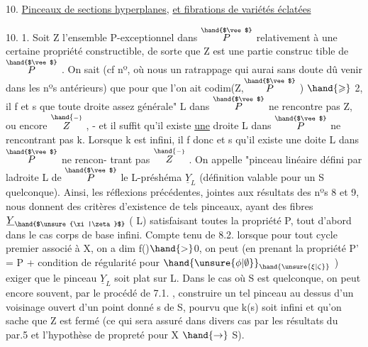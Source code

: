 
10. \uline{Pinceaux de sections hyperplanes}, \uline{et fibrations de variétés éclatées}

10. 1. Soit Z l'ensemble P-exceptionnel dans $\overset{\hand{$\vee$}}{P}$ relativement à une
certaine propriété constructible, de sorte que Z est une partie construc%
tible de $\overset{\hand{$\vee$}}{P}$ .  On sait (cf nº, où nous  un ratrappage
\margin{$/$} qui aurai sans doute dû venir dans les nºs antérieurs) que pour que
l'on ait codim(Z,$\overset{\hand{$\vee$}}{P}$ ) $\hand{\geqslant}$ 2, il f et s que toute droite assez
générale" L dans $\overset{\hand{$\vee$}}{P}$ ne rencontre pas Z,  ou encore $\overset{\hand{\scriptscriptstyle -}}{Z}$ , - et il suffit
qu'il existe \uline{une} droite L dans $\overset{\hand{$\vee$}}{P}$ ne rencontrant pas k. Lorsque 
k est infini, il f donc et s qu'il existe une doite L \margin{\unsure{$-$|$\wedge$}}dans $\overset{\hand{$\vee$}}{P}$ ne rencon-%
trant pas $\overset{\hand{\scriptscriptstyle -}}{Z}$ . On appelle "pinceau linéaire défini par ladroite
L de $\overset{\hand{$\vee$}}{P}$\hand{,} le L-préshéma $\underline{Y}_L$ (définition valable pour un S quelconque).
Ainsi, les réflexions précédentes, jointes aux résultats des nºs 8 et 9,
nous donnent des critères d'existence de tels pinceaux, ayant des fibres
$\underline{Y}_{\hand{$\unsure{\xi|\zeta}$}}$ ( \hand{$\unsure{\xi|\zeta} \in$}L) satisfaisant toutes la propriété P, tout d'abord dans le
cas   corps de base infini.  Compte tenu de
8.2.\hand{,} lorsque  pour tout cycle premier associé à X, on a dim f()$\hand{>}$0,
on peut (en prenant la propriété P' = P + condition de régularité
pour $\hand{\unsure{\phi|\emptyset}}_{\hand{\unsure{\xi|\zeta}}}$ ) exiger que le pinceau $\underline{Y}_L$ soit plat sur L. Dans le cas
où S est quelconque, on peut encore souvent, par le procédé de 7.1. ,
construire un tel pinceau au dessus d'un voisinage ouvert d'un point
donné s de S, pourvu que k(s) soit infini et qu'on sache que Z est fermé
(ce qui sera assuré dans divers cas par les résultats du par.5 et
l'hypothèse de propreté pour X $\hand{\rightarrow}$ S).

